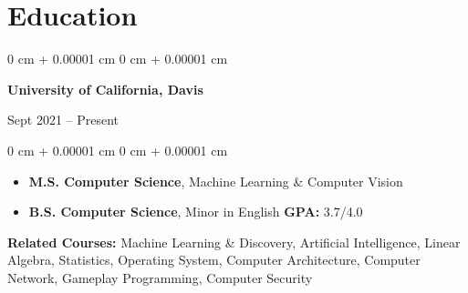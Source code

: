 \documentclass[10pt, letterpaper]{article}
\newenvironment{highlights}{
    \begin{itemize}[
        topsep=0.10 cm,
        parsep=0.10 cm,
        partopsep=0pt,
        itemsep=0pt,
        leftmargin=0 cm + 10pt
    ]
}{
    \end{itemize}
} %
\newenvironment{highlightsforbulletentries}{
    \begin{itemize}[
        topsep=0.10 cm,
        parsep=0.10 cm,
        partopsep=0pt,
        itemsep=0pt,
        leftmargin=10pt
    ]
}{
    \end{itemize}
} %
\newenvironment{onecolentry}{
    \begin{adjustwidth}{
        0 cm + 0.00001 cm
    }{
        0 cm + 0.00001 cm
    }
}{
    \end{adjustwidth}
} %
\newenvironment{twocolentry}[2][]{
    \onecolentry
    \def\secondColumn{#2}
    \setcolumnwidth{\fill, 6 cm}
    \begin{paracol}{2}
}{
    \switchcolumn \raggedleft \secondColumn
    \end{paracol}
    \endonecolentry
} %
\begin{document}
    









    \section{Education}



        
        \begin{twocolentry}{
            Sept 2021 – Present
        }
            \textbf{University of California, Davis}
            
        \end{twocolentry}

        \vspace{0.10 cm}
        \begin{onecolentry}
            \begin{highlights}
                \item \textbf{M.S. Computer Science}, Machine Learning \& Computer Vision
                \item \textbf{B.S. Computer Science}, Minor in English \textbf{GPA: } 3.7/4.0%
            \end{highlights}
            \textbf{Related Courses: } Machine Learning \& Discovery, Artificial Intelligence, Linear Algebra, Statistics, Operating System, Computer Architecture, Computer Network, Gameplay Programming, Computer Security
        \end{onecolentry}
\end{document}
